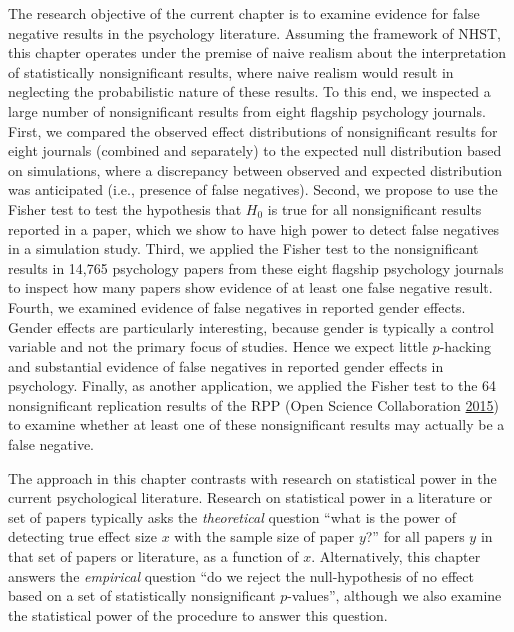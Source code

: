\documentclass[a5paper]{book}
\begin{document}
The research objective of the current chapter is to examine evidence for
false negative results in the psychology literature. Assuming the
framework of NHST, this chapter operates under the premise of naive
realism about the interpretation of statistically nonsignificant
results, where naive realism would result in neglecting the
probabilistic nature of these results. To this end, we inspected a large
number of nonsignificant results from eight flagship psychology
journals. First, we compared the observed effect distributions of
nonsignificant results for eight journals (combined and separately) to
the expected null distribution based on simulations, where a discrepancy
between observed and expected distribution was anticipated (i.e.,
presence of false negatives). Second, we propose to use the Fisher test
to test the hypothesis that \(H_0\) is true for all nonsignificant
results reported in a paper, which we show to have high power to detect
false negatives in a simulation study. Third, we applied the Fisher test
to the nonsignificant results in 14,765 psychology papers from these
eight flagship psychology journals to inspect how many papers show
evidence of at least one false negative result. Fourth, we examined
evidence of false negatives in reported gender effects. Gender effects
are particularly interesting, because gender is typically a control
variable and not the primary focus of studies. Hence we expect little
\(p\)-hacking and substantial evidence of false negatives in reported
gender effects in psychology. Finally, as another application, we
applied the Fisher test to the 64 nonsignificant replication results of
the RPP (Open Science Collaboration
\protect\hyperlink{ref-doi:10.1126ux2fscience.aac4716}{2015}) to examine
whether at least one of these nonsignificant results may actually be a
false negative.

The approach in this chapter contrasts with research on statistical
power in the current psychological literature. Research on statistical
power in a literature or set of papers typically asks the
\emph{theoretical} question \enquote{what is the power of detecting true
effect size \(x\) with the sample size of paper \(y\)?} for all papers
\(y\) in that set of papers or literature, as a function of \(x\).
Alternatively, this chapter answers the \emph{empirical} question
\enquote{do we reject the null-hypothesis of no effect based on a set of
statistically nonsignificant \(p\)-values}, although we also examine the
statistical power of the procedure to answer this question.
\end{document}
